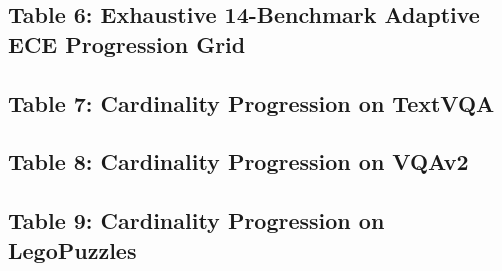 \documentclass[11pt,a4paper]{article}
\begin{document}
\subsection{Table 6: Exhaustive 14-Benchmark Adaptive ECE Progression Grid}

\clearpage
\subsection{Table 7: Cardinality Progression on TextVQA}

\clearpage
\subsection{Table 8: Cardinality Progression on VQAv2}

\clearpage
\subsection{Table 9: Cardinality Progression on LegoPuzzles}

\clearpage
\end{document}
